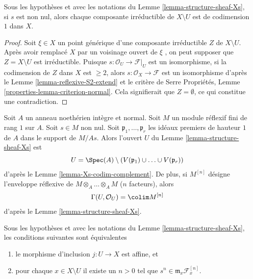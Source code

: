 \begin{lemma}
\label{lemma-Xs-codim-complement}
Sous les hypothèses et avec les notations du Lemme  \ref{lemma-structure-sheaf-Xs}, si  $s$  est non
nul, alors chaque composante irréductible de  $X \setminus U$  est de codimension
 $1$  dans  $X$.
\end{lemma}

\begin{proof}
Soit  $\xi \in X$  un point générique d'une composante irréductible  $Z$  de
 $X \setminus U$. Après avoir remplacé  $X$  par un voisinage ouvert de
 $\xi$ , on peut supposer que  $Z = X \setminus U$  est irréductible. Puisque
 $s : \mathcal{O}_U \to \mathcal{F}|_U$  est un isomorphisme, si la codimension de  $Z$  dans
 $X$  est  $\geq 2$, alors  $s : \mathcal{O}_X \to \mathcal{F}$  est un isomorphisme d'après le
Lemme  \ref{lemma-reflexive-S2-extend}  et le critère de Serre Propriétés, Lemme  \ref{properties-lemma-criterion-normal}. Cela
signifierait que  $Z = \emptyset$, ce qui constitue une contradiction.
\end{proof}

\begin{remark}
\label{remark-structure-sheaf-Xs}
Soit  $A$  un anneau noethérien intègre et normal. Soit  $M$  un
module réflexif fini de rang  $1$  sur  $A$. Soit  $s \in M$  non nul. Soit
 $\mathfrak p_1, \ldots, \mathfrak p_r$  les idéaux premiers de hauteur  $1$  de  $A$  dans le
support de  $M/As$. Alors l'ouvert  $U$  du Lemme  \ref{lemma-structure-sheaf-Xs}  est
$$
U = \Spec(A) \setminus
\left(V(\mathfrak p_1) \cup \ldots \cup V(\mathfrak p_r)\right)
$$
d'après le Lemme  \ref{lemma-Xs-codim-complement}. De plus, si  $M^{[n]}$  désigne l'enveloppe
réflexive de  $M \otimes_A \ldots \otimes_A M$  ($n$ facteurs), alors
$$
\Gamma(U, \mathcal{O}_U) = \colim M^{[n]}
$$
d'après le Lemme  \ref{lemma-structure-sheaf-Xs}.
\end{remark}

\begin{lemma}
\label{lemma-affine-Xs}
Sous les hypothèses et avec les notations du Lemme  \ref{lemma-structure-sheaf-Xs}, les conditions suivantes
sont équivalentes
\begin{enumerate}
\item le morphisme d'inclusion  $j : U \to X$  est affine, et
\item pour chaque  $x \in X \setminus U$  il existe un  $n > 0$  tel que  $s^n \in \mathfrak m_x \mathcal{F}^{[n]}_x$.
\end{enumerate}
\end{lemma}

